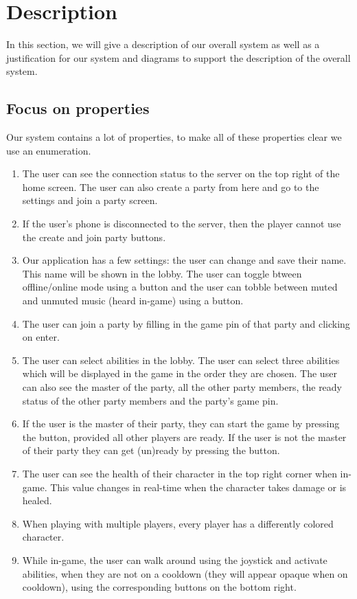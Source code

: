 \documentclass[../main.tex]{subfiles}
\begin{document}
\pagebreak
\section{Description}
In this section, we will give a description of our overall system as well as a justification for our system and diagrams to support the description of the overall system.

	\subsection{Focus on properties}\label{sec: properties}
	Our system contains a lot of properties, to make all of these properties clear we use an enumeration.
	\begin{enumerate}
		\item The user can see the connection status to the server on the top right of the home screen. The user can also create a party from here and go to the settings and join a party screen.
		\item If the user's phone is disconnected to the server, then the player cannot use the create and join party buttons.
		\item Our application has a few settings: the user can change and save their name. This name will be shown in the lobby. The user can toggle btween offline/online mode using a button and the user can tobble between muted and unmuted music (heard in-game) using a button.
		\item The user can join a party by filling in the game pin of that party and clicking on enter.
		\item The user can select abilities in the lobby. The user can select three abilities which will be displayed in the game in the order they are chosen. The user can also see the master of the party, all the other party members, the ready status of the other party members and the party's game pin.
		\item If the user is the master of their party, they can start the game by pressing the button, provided all other players are ready. If the user is not the master of their party they can get (un)ready by pressing the button.
		\item The user can see the health of their character in the top right corner when in-game. This value changes in real-time when the character takes damage or is healed.
		\item When playing with multiple players, every player has a differently colored character.		
		\item While in-game, the user can walk around using the joystick and activate abilities, when they are not on a cooldown (they will appear opaque when on cooldown), using the corresponding buttons on the bottom right. 

\end{enumerate}
\end{document}
